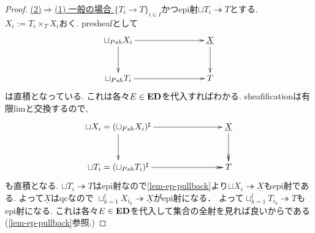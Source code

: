 \documentclass[dvipdfmx,a4paper,11pt]{report}
\theoremstyle{definition}
\begin{document}
\begin{proof}
\underline{(2)$\Rightarrow$(1) 一般の場合 }
$\{ T_i \to T\}_{i \in I}$かつepi射$\sqcup T_i \twoheadrightarrow T$とする. 
$X_i := T_i \times_{T} X_i$おく. 
presheafとして
\begin{equation*}
\xymatrix@C=80pt@R=30pt{
\sqcup_{Psh} X_i  \ar@{->}[r]\ar@{->}[d]
&\underline{X} \ar@{->}[d] \\
\sqcup_{Psh} T_i \ar@{->}[r]
&T \\   
}
\end{equation*}
は直積となっている. 
これは各々$E \in {\bf ED}$を代入すればわかる.
sheafificationは有限limと交換するので, 
\begin{equation*}
\xymatrix@C=80pt@R=30pt{
\sqcup X_i  =(\sqcup_{Psh} X_i )^{\sharp} \ar@{->}[r]\ar@{->}[d]
&\underline{X} \ar@{->>}[d] \\
\sqcup T_i  = (\sqcup_{Psh} T_i )^{\sharp}\ar@{->>}[r]
&T \\   
}
\end{equation*}
も直積となる. 
$\sqcup T_i \twoheadrightarrow T$はepi射なので\ref{lem-ep-pullback}より$\sqcup X_i \twoheadrightarrow \underline{X}$もepi射である.
よって$\underline{X}$はqcなので
$\sqcup_{k=1}^{l} X_{i_k} \twoheadrightarrow \underline{X}$がepi射になる．
よって$\sqcup_{k=1}^{l}T_{i_k} \twoheadrightarrow T$もepi射になる.
 これは各々$E \in {\bf ED}$を代入して集合の全射を見れば良いからである(\ref{lem-ep-pullback}参照.)
 \end{proof}
 
\end{document}
